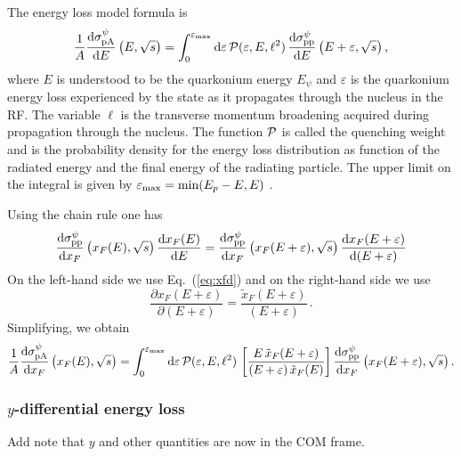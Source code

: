 \documentclass[11pt,onecolumn]{article}
\newcommand{\dd}{{\rm d}}
\newcommand{\beq}{\begin{equation}}
\newcommand{\eeq}{\end{equation}}
\begin{document}
The energy loss model formula is
%
\beq
\frac{1}{A}\frac{\dd\sigma_{\mathrm{pA}}^{\psi}}{\dd E}\left(E, \sqrt{s} \right)  = \int_0^{\varepsilon_{\rm max}} \dd \varepsilon \,{\cal P}(\varepsilon, E, \ell^2) \, \frac{\dd\sigma_{\mathrm{pp}}^{\psi}}{\dd E} \left( E+\varepsilon, \sqrt{s}\right) ,
\eeq
%
where $E$ is understood to be the quarkonium energy $E_\psi$ and $\varepsilon$ is the quarkonium energy loss experienced by the state as it propagates through the nucleus in the RF. The variable $\ell$ is the transverse momentum broadening acquired during propagation through the nucleus.  The function $\cal P$ is called the quenching weight and is the probability density for the energy loss distribution as function of the radiated energy and the final energy of the radiating particle.  The upper limit on the integral is given by $\varepsilon_{\rm max} = {\rm min}(E_p-E,E)$ \cite{Arleo:2012rs}.

Using the chain rule one has
%
\beq
\frac{\dd\sigma_{\mathrm{pp}}^{\psi}}{\dd x_F} \left( x_F(E), \sqrt{s}\right) \frac{\dd x_F(E) }{\dd E}  = \frac{\dd\sigma_{\mathrm{pp}}^{\psi}}{\dd x_F} \left( x_F(E+\varepsilon), \sqrt{s}\right) \frac{\dd x_F(E+\varepsilon) }{\dd (E + \varepsilon)} 
\eeq
%
On the left-hand side we use Eq.~(\ref{eq:xfd}) and on the right-hand side we use
%
\beq
\frac{\partial x_F(E+\varepsilon)}{\partial (E+\varepsilon)} = \frac{\tilde{x}_F(E+\varepsilon)}{(E+\varepsilon)} \, .
\eeq
%
Simplifying, we obtain
%
\beq
\frac{1}{A}\frac{\dd\sigma_{\mathrm{pA}}^{\psi}}{\dd x_F}\left(x_F(E), \sqrt{s} \right)  = \int_0^{\varepsilon_{\rm max}} \dd \varepsilon \,{\cal P}(\varepsilon, E, \ell^2) \, \left[ \frac{E \, \tilde{x}_F(E+\varepsilon)}{(E+\varepsilon) \, \tilde{x}_F(E) } \right] \frac{\dd\sigma_{\mathrm{pp}}^{\psi}}{\dd x_F} \left( x_F(E+\varepsilon), \sqrt{s}\right) .
\eeq

\subsubsection{$y$-differential energy loss}

{\color{red} Add note that $y$ and other quantities are now in the COM frame.}
\end{document}
